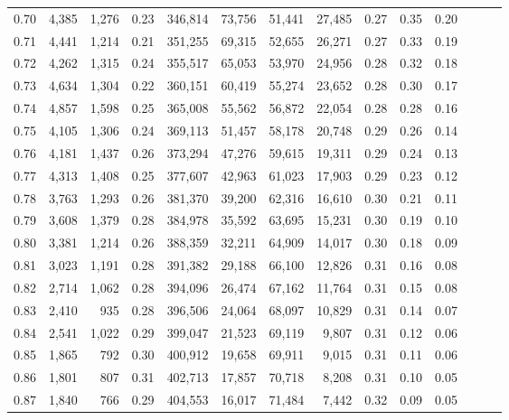 \begin{tabular}{rrrrrrrrrrrrrr}
0.70 &   4,385 &  1,276 &  0.23 &  346,814 &   73,756 &  51,441 &  27,485 &  0.27 &  0.35 &      0.20 \\
0.71 &   4,441 &  1,214 &  0.21 &  351,255 &   69,315 &  52,655 &  26,271 &  0.27 &  0.33 &      0.19 \\
0.72 &   4,262 &  1,315 &  0.24 &  355,517 &   65,053 &  53,970 &  24,956 &  0.28 &  0.32 &      0.18 \\
0.73 &   4,634 &  1,304 &  0.22 &  360,151 &   60,419 &  55,274 &  23,652 &  0.28 &  0.30 &      0.17 \\
0.74 &   4,857 &  1,598 &  0.25 &  365,008 &   55,562 &  56,872 &  22,054 &  0.28 &  0.28 &      0.16 \\
0.75 &   4,105 &  1,306 &  0.24 &  369,113 &   51,457 &  58,178 &  20,748 &  0.29 &  0.26 &      0.14 \\
0.76 &   4,181 &  1,437 &  0.26 &  373,294 &   47,276 &  59,615 &  19,311 &  0.29 &  0.24 &      0.13 \\
0.77 &   4,313 &  1,408 &  0.25 &  377,607 &   42,963 &  61,023 &  17,903 &  0.29 &  0.23 &      0.12 \\
0.78 &   3,763 &  1,293 &  0.26 &  381,370 &   39,200 &  62,316 &  16,610 &  0.30 &  0.21 &      0.11 \\
0.79 &   3,608 &  1,379 &  0.28 &  384,978 &   35,592 &  63,695 &  15,231 &  0.30 &  0.19 &      0.10 \\
0.80 &   3,381 &  1,214 &  0.26 &  388,359 &   32,211 &  64,909 &  14,017 &  0.30 &  0.18 &      0.09 \\
0.81 &   3,023 &  1,191 &  0.28 &  391,382 &   29,188 &  66,100 &  12,826 &  0.31 &  0.16 &      0.08 \\
0.82 &   2,714 &  1,062 &  0.28 &  394,096 &   26,474 &  67,162 &  11,764 &  0.31 &  0.15 &      0.08 \\
0.83 &   2,410 &    935 &  0.28 &  396,506 &   24,064 &  68,097 &  10,829 &  0.31 &  0.14 &      0.07 \\
0.84 &   2,541 &  1,022 &  0.29 &  399,047 &   21,523 &  69,119 &   9,807 &  0.31 &  0.12 &      0.06 \\
0.85 &   1,865 &    792 &  0.30 &  400,912 &   19,658 &  69,911 &   9,015 &  0.31 &  0.11 &      0.06 \\
0.86 &   1,801 &    807 &  0.31 &  402,713 &   17,857 &  70,718 &   8,208 &  0.31 &  0.10 &      0.05 \\
0.87 &   1,840 &    766 &  0.29 &  404,553 &   16,017 &  71,484 &   7,442 &  0.32 &  0.09 &      0.05 \\

\end{tabular}
